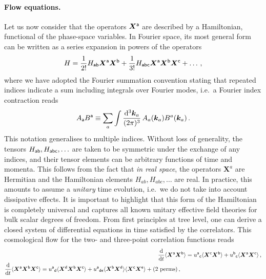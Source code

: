 \documentclass[11pt]{article}
\numberwithin{equation}{section} %
\def \d {\mathrm{d}}
\begin{document}
\paragraph{Flow equations.} Let us now consider that the operators $\bm{X}^{\sf{a}}$ are described by a Hamiltonian, functional of the phase-space variables. In Fourier space, its most general form can be written as a series expansion in powers of the operators
\begin{equation}
    H = \frac{1}{2!} H_{\sf{ab}} \bm{X}^{\sf{a}} \bm{X}^{\sf{b}} + \frac{1}{3!} H_{\sf{abc}} \bm{X}^{\sf{a}} \bm{X}^{\sf{b}} \bm{X}^{\sf{c}} + \ldots \,,
\end{equation}
where we have adopted the Fourier summation convention stating that repeated indices indicate a sum including
integrals over Fourier modes, i.e.~a Fourier index contraction reads
\begin{equation}
\label{eq: Fourier index contraction}
    A_{\sf{a}} B^{\sf{a}} \equiv \sum_a \int \frac{\d^3 \bm{k}_a}{(2\pi)^3}\, A_a(\bm{k}_a) B^a(\bm{k}_a)\,.
\end{equation}
This notation generalises to multiple indices. Without loss of generality, the tensors $H_{\sf{ab}}, H_{\sf{abc}}, \ldots$ are taken to be symmetric under the exchange of any indices, and their tensor elements can be arbitrary functions of time and momenta. This follows from the fact that \textit{in real space}, the operators $\bm{X}^a$ are Hermitian and the Hamiltonian elements $H_{ab}, H_{abc}, \ldots$ are real. In practice, this amounts to assume a \textit{unitary} time evolution, i.e.~we do not take into account dissipative effects. It is important to highlight that this form of the Hamiltonian is completely universal and captures all known unitary effective field theories for bulk scalar degrees of freedom. From first principles at tree level, one can derive a closed system of differential equations in time satisfied by the correlators. This cosmological flow for the two- and three-point correlation functions reads
\begin{subequations}
\begin{align}
    \frac{\d}{\d t} \langle \bm{X}^{\sf{a}} \bm{X}^{\sf{b}} \rangle &= \tensor{u}{^{\sf{a}}}{_{\sf{c}}} \langle \bm{X}^{\sf{c}} \bm{X}^{\sf{b}} \rangle + \tensor{u}{^{\sf{b}}}{_{\sf{c}}} \langle \bm{X}^{\sf{a}} \bm{X}^{\sf{c}} \rangle\,,\label{eq: 2pt time evolution}\\
    \begin{split}
    \frac{\d}{\d t} \langle \bm{X}^{\sf{a}} \bm{X}^{\sf{b}}\bm{X}^{\sf{c}} \rangle &= \tensor{u}{^{\sf{a}}}{_{\sf{d}}} \langle \bm{X}^{\sf{d}} \bm{X}^{\sf{b}}\bm{X}^{\sf{c}} \rangle
    + \tensor{u}{^{\sf{a}}}{_{\sf{de}}}\langle \bm{X}^{\sf{b}} \bm{X}^{\sf{d}} \rangle\langle \bm{X}^{\sf{c}} \bm{X}^{\sf{e}} \rangle + (2\text{ perms})\,,\label{eq: 3pt time evolution}
    \end{split}
\end{align}
\end{subequations}
\end{document}
